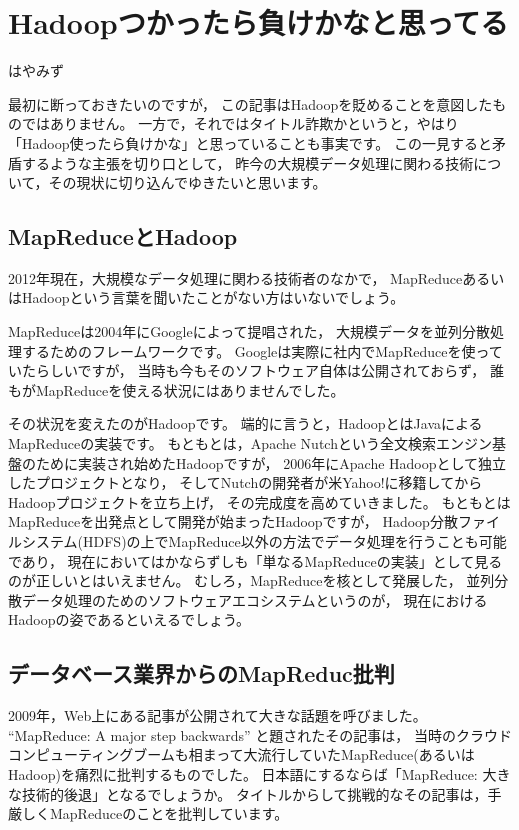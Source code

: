 
\chapter{Hadoopつかったら負けかなと思ってる}

\begin{flushright}
はやみず
\end{flushright}

最初に断っておきたいのですが，
この記事はHadoopを貶めることを意図したものではありません。
一方で，それではタイトル詐欺かというと，やはり「Hadoop使ったら負けかな」と思っていることも事実です。
この一見すると矛盾するような主張を切り口として，
昨今の大規模データ処理に関わる技術について，その現状に切り込んでゆきたいと思います。

\section{MapReduceとHadoop}

2012年現在，大規模なデータ処理に関わる技術者のなかで，
MapReduceあるいはHadoopという言葉を聞いたことがない方はいないでしょう。

MapReduceは2004年にGoogleによって提唱された，
大規模データを並列分散処理するためのフレームワークです\cite{Dean:2004:MSD:1251254.1251264}。
Googleは実際に社内でMapReduceを使っていたらしいですが，
当時も今もそのソフトウェア自体は公開されておらず，
誰もがMapReduceを使える状況にはありませんでした。

その状況を変えたのがHadoopです。
端的に言うと，HadoopとはJavaによるMapReduceの実装です。
もともとは，Apache Nutchという全文検索エンジン基盤のために実装され始めたHadoopですが，
2006年にApache Hadoopとして独立したプロジェクトとなり，
そしてNutchの開発者が米Yahoo!に移籍してからHadoopプロジェクトを立ち上げ，
その完成度を高めていきました。
もともとはMapReduceを出発点として開発が始まったHadoopですが，
Hadoop分散ファイルシステム(HDFS)の上でMapReduce以外の方法でデータ処理を行うことも可能であり，
現在においてはかならずしも「単なるMapReduceの実装」として見るのが正しいとはいえません。
むしろ，MapReduceを核として発展した，
並列分散データ処理のためのソフトウェアエコシステムというのが，
現在におけるHadoopの姿であるといえるでしょう。

\section{データベース業界からのMapReduc批判}

2009年，Web上にある記事が公開されて大きな話題を呼びました。
``MapReduce: A major step backwards'' と題されたその記事は，
当時のクラウドコンピューティングブームも相まって大流行していたMapReduce(あるいはHadoop)を痛烈に批判するものでした。
日本語にするならば「MapReduce: 大きな技術的後退」となるでしょうか。
タイトルからして挑戦的なその記事は，手厳しくMapReduceのことを批判しています。

